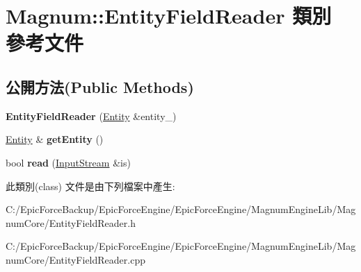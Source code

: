 \hypertarget{class_magnum_1_1_entity_field_reader}{}\section{Magnum\+:\+:Entity\+Field\+Reader 類別 參考文件}
\label{class_magnum_1_1_entity_field_reader}
\subsection*{公開方法(Public Methods)}
\begin{DoxyCompactItemize}
\item 
{\bfseries Entity\+Field\+Reader} (\hyperlink{class_magnum_1_1_entity}{Entity} \&entity\+\_\+)\hypertarget{class_magnum_1_1_entity_field_reader_afe2bd63c4d51080a7bac74d428a6ce87}{}\label{class_magnum_1_1_entity_field_reader_afe2bd63c4d51080a7bac74d428a6ce87}

\item 
\hyperlink{class_magnum_1_1_entity}{Entity} \& {\bfseries get\+Entity} ()\hypertarget{class_magnum_1_1_entity_field_reader_a75432dea9b7f5a36d2394bdd8ab71e90}{}\label{class_magnum_1_1_entity_field_reader_a75432dea9b7f5a36d2394bdd8ab71e90}

\item 
bool {\bfseries read} (\hyperlink{class_magnum_1_1_input_stream}{Input\+Stream} \&is)\hypertarget{class_magnum_1_1_entity_field_reader_a6762cd8a608ef7cd2065a8fc79e4ef3b}{}\label{class_magnum_1_1_entity_field_reader_a6762cd8a608ef7cd2065a8fc79e4ef3b}

\end{DoxyCompactItemize}


此類別(class) 文件是由下列檔案中產生\+:\begin{DoxyCompactItemize}
\item 
C\+:/\+Epic\+Force\+Backup/\+Epic\+Force\+Engine/\+Epic\+Force\+Engine/\+Magnum\+Engine\+Lib/\+Magnum\+Core/Entity\+Field\+Reader.\+h\item 
C\+:/\+Epic\+Force\+Backup/\+Epic\+Force\+Engine/\+Epic\+Force\+Engine/\+Magnum\+Engine\+Lib/\+Magnum\+Core/Entity\+Field\+Reader.\+cpp\end{DoxyCompactItemize}
